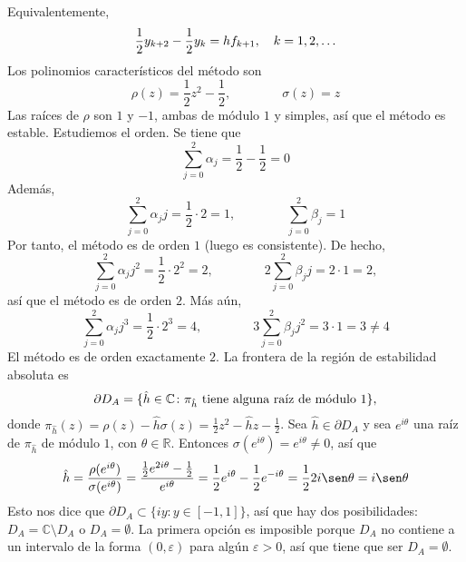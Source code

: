 \documentclass[11pt]{report}
\newcommand{\R}{\mathbb R}
\newcommand{\C}{\mathbb C}
\begin{document}
\begin{enumerate}
     Equivalentemente,
     \[\frac{1}{2}y_{k+2}-\frac{1}{2}y_{k} = hf_{k+1}, \quad k = 1,2,\mathellipsis\]
     Los polinomios característicos del método son 
     \[\rho(z)=\frac{1}{2}z^2-\frac{1}{2}, \qquad \qquad \sigma(z)=z\]
     Las raíces de $\rho$ son $1$ y $-1$, ambas de módulo $1$ y simples, así que el método es estable. Estudiemos el orden. Se tiene que
     \[\sum_{j=0}^2 \alpha_j = \frac{1}{2}-\frac{1}{2} = 0\]
     Además,
     \[\sum_{j=0}^2 \alpha_jj = \frac{1}{2} \cdot 2 = 1, \qquad \qquad \sum_{j=0}^2 \beta_j = 1\]
     Por tanto, el método es de orden $1$ (luego es consistente). De hecho,
     \[\sum_{j=0}^2\alpha_jj^2 = \frac{1}{2} \cdot 2^2 = 2, \qquad \qquad 2\sum_{j=0}^2 \beta_j j = 2 \cdot 1 = 2, \]
     así que el método es de orden $2$. Más aún,
     \[\sum_{j=0}^2 \alpha_jj^3 = \frac{1}{2}\cdot 2^3 = 4, \qquad \qquad 3\sum_{j=0}^2 \beta_jj^2 = 3 \cdot 1 = 3 \neq 4\]
     El método es de orden exactamente $2$. La frontera de la región de estabilidad absoluta es
     \[\partial D_A = \{\hat{h} \in \C \colon \pi_{\hat{h}} \textup{ tiene alguna raíz de módulo } 1\},\]
     donde $\pi_{\hat{h}}(z)=\rho(z)-\hat{h}\sigma(z)=\frac{1}{2}z^2-\hat{h}z-\frac{1}{2}$. Sea $\hat{h} \in \partial D_A$ y sea $e^{i\theta}$ una raíz de $\pi_{\hat{h}}$ de módulo $1$, con $\theta \in \R$. Entonces $\sigma(e^{i\theta}) = e^{i\theta} \neq 0$, así que
     \[\hat{h} = \frac{\rho(e^{i\theta})}{\sigma(e^{i\theta})} = \frac{\frac{1}{2}e^{2i\theta}-\frac{1}{2}}{e^{i\theta}} = \frac{1}{2}e^{i\theta}-\frac{1}{2}e^{-i\theta} =\frac{1}{2}2i\sen \theta = i\sen \theta\]
     Esto nos dice que $\partial D_A \subset \{iy \colon y \in [-1,1]\}$, así que hay dos posibilidades: $D_A = \C \setminus D_A$ o $D_A = \emptyset$. La primera opción es imposible porque $D_A$ no contiene a un intervalo de la forma $(0,\varepsilon)$ para algún $\varepsilon>0$, así que tiene que ser $D_A = \emptyset$.
\end{enumerate}
\end{document}
